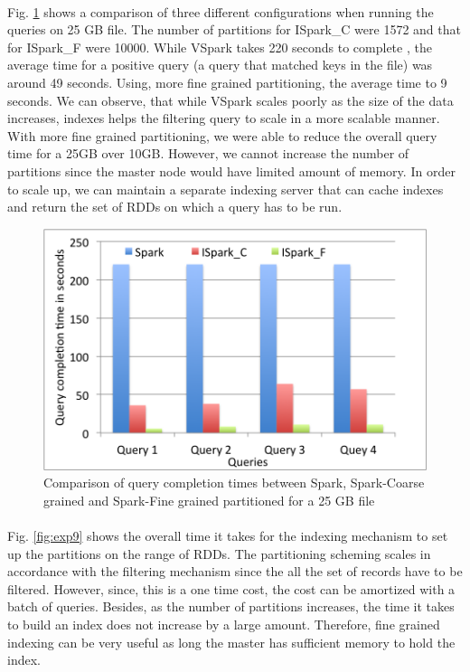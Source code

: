 \paragraph{}
Fig. \ref{fig:exp8} shows a comparison of three different configurations when running the queries on 25 GB file. The number of partitions for ISpark\_C were 1572 and that for ISpark\_F were 10000. While VSpark takes 220 seconds to complete , the average time for a positive query (a query that matched keys in the file) was around 49 seconds. Using, more fine grained partitioning, the average time to 9 seconds. We can observe, that while VSpark scales poorly as the size of the data increases, indexes helps the filtering query to scale in a more scalable manner. With more fine grained partitioning, we were able to reduce the overall query time for a 25GB over 10GB. However, we cannot increase the number of partitions since the master node would have limited amount of memory. In order to scale up, we can maintain a separate indexing server that can cache indexes and return the set of RDDs on which a query has to be run. 

\begin{figure}[!ht]
\caption{Comparison of query completion times between Spark, Spark-Coarse grained and Spark-Fine grained partitioned for a 25 GB file}
\label{fig:exp8}
\includegraphics[scale=0.50]{./images/exp8.png}
\end{figure}

\paragraph{}
Fig. \ref{fig:exp9} shows the overall time it takes for the indexing mechanism to set up the partitions on the range of RDDs. The partitioning scheming scales in accordance with the filtering mechanism since the all the set of records have to be filtered. However, since, this is a one time cost, the cost can be amortized with a batch of queries. Besides, as the number of partitions increases, the time it takes to build an index does not increase by a large amount. Therefore, fine grained indexing can be very useful as long the master has sufficient memory to hold the index.

